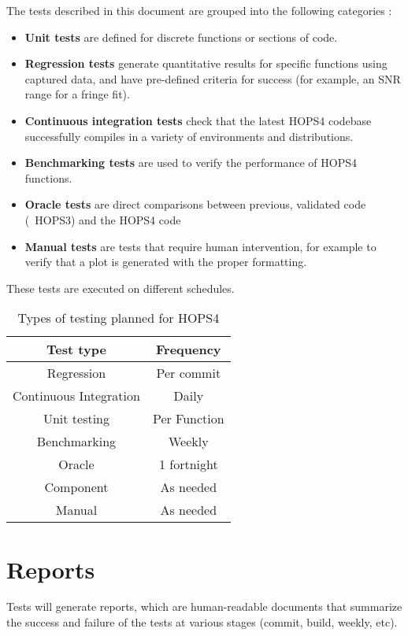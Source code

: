 \documentclass[notitlepage,letterpaper,pdftex,12pt,final]{article}
\numberwithin{equation}{section}
\begin{document}
The tests described in this document are grouped into the following categories :

\begin{itemize}
\item[] \textbf{Unit tests} are defined for discrete functions or sections of code.
\item[] \textbf{Regression tests} generate quantitative results for specific
  functions using captured data, and have pre-defined criteria for success (for example, an SNR range for a fringe fit).
\item[] \textbf{Continuous integration tests} check that the latest HOPS4
  codebase successfully compiles in a variety of environments and distributions.
\item[] \textbf{Benchmarking tests} are used to verify the performance of HOPS4 functions.
\item[] \textbf{Oracle tests} are direct comparisons between previous, validated
  code (\eg~HOPS3) and the HOPS4 code
\item[] \textbf{Manual tests} are tests that require human intervention, for
  example to verify that a plot is generated with the proper formatting.

\end{itemize}

These tests are executed on different schedules.

\begin{table}[h!]
\centering
 \begin{tabular}{c | c} 
 Test type & Frequency \\ [0.5ex] 
 \hline%
 Regression &  Per commit \\ 
 Continuous Integration & Daily \\
 Unit testing & Per Function \\ 
 Benchmarking & Weekly \\
 Oracle  & 1 fortnight \\
 Component & As needed \\ 
 Manual & As needed \\ [1ex]
 \end{tabular}
 \caption{Types of testing planned for HOPS4}
 \label{table:2}
\end{table}




\section{Reports}
\label{sec:reports}
Tests will generate reports, which are human-readable documents that
summarize the success and failure of the tests at various stages
(commit, build, weekly, etc). 
\end{document}
